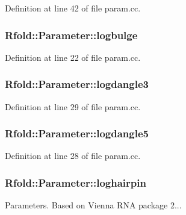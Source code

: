 Definition at line 42 of file param.\+cc.

\hypertarget{namespace_rfold_1_1_parameter_a20e8624e389beca2f1df6a9aebc9bbe2}{
\subsubsection[{logbulge}]{ Rfold\+::\+Parameter\+::logbulge}}\label{namespace_rfold_1_1_parameter_a20e8624e389beca2f1df6a9aebc9bbe2}


Definition at line 22 of file param.\+cc.

\hypertarget{namespace_rfold_1_1_parameter_a7ebf93e2b64043655dfd704b20027f66}{
\subsubsection[{logdangle3}]{ Rfold\+::\+Parameter\+::logdangle3}}\label{namespace_rfold_1_1_parameter_a7ebf93e2b64043655dfd704b20027f66}


Definition at line 29 of file param.\+cc.

\hypertarget{namespace_rfold_1_1_parameter_abc3f765f6034c3b0d649c4aa7260a57a}{
\subsubsection[{logdangle5}]{ Rfold\+::\+Parameter\+::logdangle5}}\label{namespace_rfold_1_1_parameter_abc3f765f6034c3b0d649c4aa7260a57a}


Definition at line 28 of file param.\+cc.

\hypertarget{namespace_rfold_1_1_parameter_a77b3fdd09fce9d33d5a82dc3010e0f2f}{
\subsubsection[{loghairpin}]{ Rfold\+::\+Parameter\+::loghairpin}}\label{namespace_rfold_1_1_parameter_a77b3fdd09fce9d33d5a82dc3010e0f2f}
Parameters. Based on Vienna R\+N\+A package 2... 

